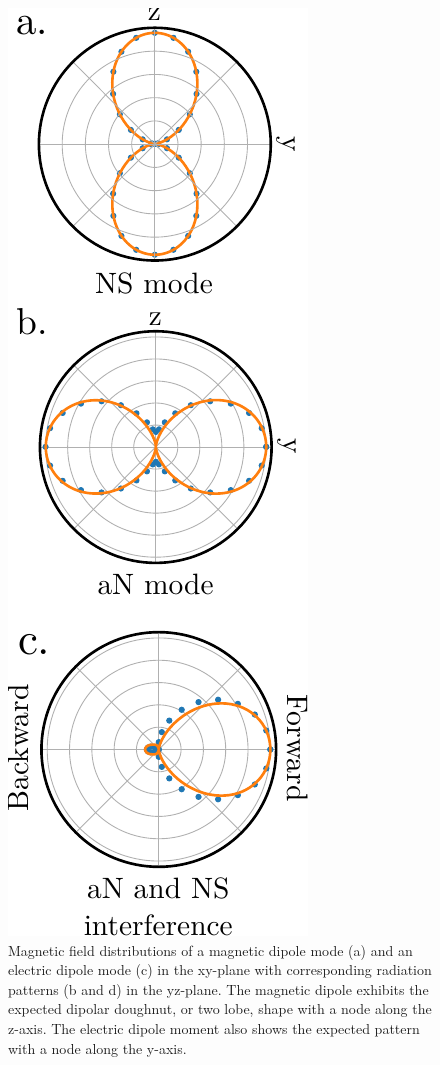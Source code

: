 \documentclass[journal=apchd5,manuscript=article]{achemso}
\begin{document}
\begin{figure}
\includegraphics{fig3.pdf}
\caption{Magnetic field distributions of a magnetic dipole mode (a) and an electric dipole mode (c) in the xy-plane with corresponding radiation patterns (b and d) in the yz-plane. The magnetic dipole exhibits the expected dipolar doughnut, or two lobe, shape with a node along the z-axis. The electric dipole moment also shows the expected pattern with a node along the y-axis.}
\label{scattering}
\end{figure}
\end{document}
